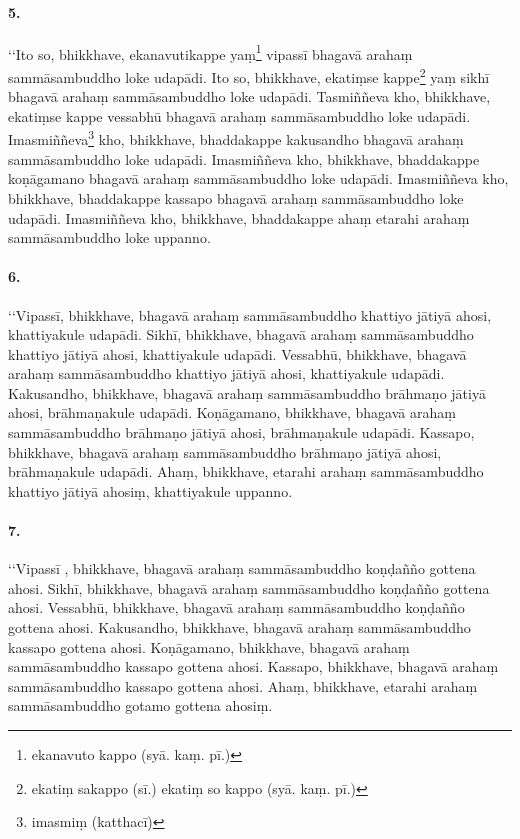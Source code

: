 \paragraph{5.} ‘‘Ito so, bhikkhave, ekanavutikappe yaṃ\footnote{ekanavuto kappo (syā. kaṃ. pī.)} vipassī bhagavā arahaṃ sammāsambuddho loke udapādi. Ito so, bhikkhave, ekatiṃse kappe\footnote{ekatiṃ sakappo (sī.) ekatiṃ so kappo (syā. kaṃ. pī.)} yaṃ sikhī bhagavā arahaṃ sammāsambuddho loke udapādi. Tasmiññeva kho, bhikkhave, ekatiṃse kappe vessabhū bhagavā arahaṃ sammāsambuddho loke udapādi. Imasmiññeva\footnote{imasmiṃ (katthacī)} kho, bhikkhave, bhaddakappe kakusandho bhagavā arahaṃ sammāsambuddho loke udapādi. Imasmiññeva kho, bhikkhave, bhaddakappe koṇāgamano bhagavā arahaṃ sammāsambuddho loke udapādi. Imasmiññeva kho, bhikkhave, bhaddakappe kassapo bhagavā arahaṃ sammāsambuddho loke udapādi. Imasmiññeva kho, bhikkhave, bhaddakappe ahaṃ etarahi arahaṃ sammāsambuddho loke uppanno.

\paragraph{6.} ‘‘Vipassī, bhikkhave, bhagavā arahaṃ sammāsambuddho khattiyo jātiyā ahosi, khattiyakule udapādi. Sikhī, bhikkhave, bhagavā arahaṃ sammāsambuddho khattiyo jātiyā ahosi, khattiyakule udapādi. Vessabhū, bhikkhave, bhagavā arahaṃ sammāsambuddho khattiyo jātiyā ahosi, khattiyakule udapādi. Kakusandho, bhikkhave, bhagavā arahaṃ sammāsambuddho brāhmaṇo jātiyā ahosi, brāhmaṇakule udapādi. Koṇāgamano, bhikkhave, bhagavā arahaṃ sammāsambuddho brāhmaṇo jātiyā ahosi, brāhmaṇakule udapādi. Kassapo, bhikkhave, bhagavā arahaṃ sammāsambuddho brāhmaṇo jātiyā ahosi, brāhmaṇakule udapādi. Ahaṃ, bhikkhave, etarahi arahaṃ sammāsambuddho khattiyo jātiyā ahosiṃ, khattiyakule uppanno.

\paragraph{7.} ‘‘Vipassī , bhikkhave, bhagavā arahaṃ sammāsambuddho koṇḍañño gottena ahosi. Sikhī, bhikkhave, bhagavā arahaṃ sammāsambuddho koṇḍañño gottena ahosi. Vessabhū, bhikkhave, bhagavā arahaṃ sammāsambuddho koṇḍañño gottena ahosi. Kakusandho, bhikkhave, bhagavā arahaṃ sammāsambuddho kassapo gottena ahosi. Koṇāgamano, bhikkhave, bhagavā arahaṃ sammāsambuddho kassapo gottena ahosi. Kassapo, bhikkhave, bhagavā arahaṃ sammāsambuddho kassapo gottena ahosi. Ahaṃ, bhikkhave, etarahi arahaṃ sammāsambuddho gotamo gottena ahosiṃ.

